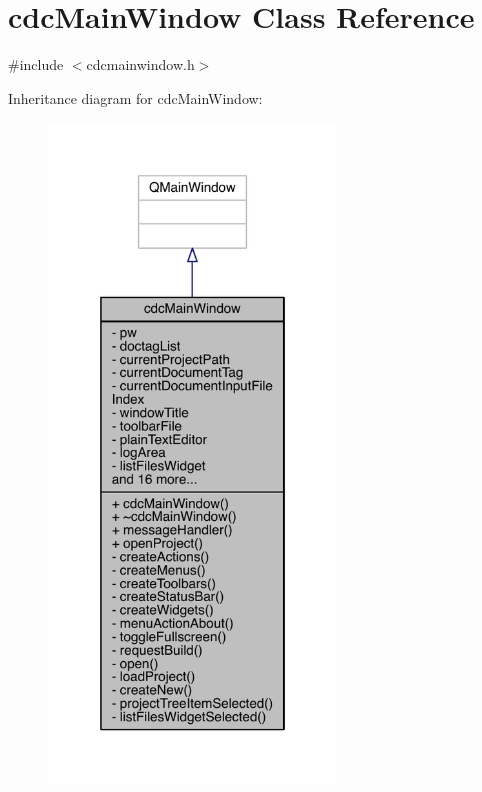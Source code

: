 \hypertarget{classcdc_main_window}{\section{cdc\+Main\+Window Class Reference}
\label{classcdc_main_window}
}


{\ttfamily \#include $<$cdcmainwindow.\+h$>$}



Inheritance diagram for cdc\+Main\+Window\+:\nopagebreak
\begin{figure}[H]
\begin{center}
\leavevmode
\includegraphics[width=217pt]{classcdc_main_window__inherit__graph}
\end{center}
\end{figure}


